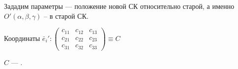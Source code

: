 Зададим параметры --- положение новой СК относительно старой, а именно $O'(\alpha,\beta,\gamma)$ -- в старой СК.

Координаты $\bar{e}_i': \begin{pmatrix}
c_{11} & c_{12} & c_{13} \\
c_{21} & c_{22} & c_{23} \\
c_{31} & c_{32} & c_{33}
\end{pmatrix} \equiv C$

\begin{opred}
$C$ --- .
\end{opred}
